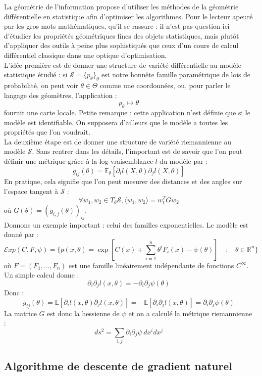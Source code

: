 \documentclass{article}
\theoremstyle{definition}
\newcommand{\R}{\mathbb R}
\begin{document}
La géométrie de l'information propose d'utiliser les méthodes de la géométrie différentielle en statistique afin d'optimiser les algorithmes. Pour le lecteur apeuré par les gros mots mathématiques, qu'il se rassure : il n'est pas question ici d'étudier les propriétés géométriques fines des objets statistiques, mais plutôt d'appliquer des outils à peine plus sophistiqués que ceux d'un cours de calcul différentiel classique dans une optique d'optimisation.\\

 L'idée première est de donner une structure de variété différentielle au modèle statistique étudié : si $\mathcal S = \{p_\theta\}_\theta$ est notre honnête famille paramétrique de lois de probabilité, on peut voir $\theta \in \Theta$ comme une coordonnées, ou, pour parler le langage des géomètres, l'application : \[p_\theta \mapsto \theta\] fournit une carte locale. Petite remarque : cette application n'est définie que si le modèle est identifiable. On supposera d'ailleurs que le modèle a toutes les propriétés que l'on voudrait.\\

La deuxième étape est de donner une structure de variété riemannienne au modèle $\mathcal S$. Sans rentrer dans les détails, l'important est de savoir que l'on peut définir une métrique grâce à la log-vraisemblance $l$ du modèle par :
\[g_{ij} (\theta) = \mathbb E_\theta[\partial_i l(X,\theta) \partial_j l(X,\theta)]\]
En pratique, cela signifie que l'on peut mesurer des distances et des angles sur l'espace tangent à $\mathcal S$ : 
\[\forall w_1,w_2 \in T_\theta \mathcal S, \langle w_1 , w_2 \rangle = w_1^T G w_2\] où $G(\theta)=(g_{i,j}(\theta))_{ij}$.\\

Donnons un exemple important : celui des familles exponentielles. Le modèle est donné par :
\[\mathcal{E}xp(C,F,\psi) = \{p(x,\theta)=\exp[C(x)+\sum_{i=1}^n \theta^i F_i(x) -\psi(\theta)] \quad :\quad  \theta \in \R^n\}\]
où $F=(F_1,...,F_n)$ est une famille linéairement indépendante de fonctions $C^\infty$. Un simple calcul donne :
\[\partial_i \partial_j l(x,\theta) =-\partial_i \partial_j \psi(\theta)\]
Donc :
\[g_{ij}(\theta) =\mathbb E[\partial_i l(x,\theta)\partial_j l(x,\theta)]=-\mathbb E[\partial_i\partial_j l(x,\theta)]=\partial_i \partial_j \psi(\theta)\]
La matrice $G$ est donc la hessienne de $\psi$ et on a calculé la métrique riemannienne :
\[ds^2= \sum_{i,j} \partial_i \partial_j \psi \ dx^i dx^j\]

\subsection{Algorithme de descente de gradient naturel}
\end{document}
